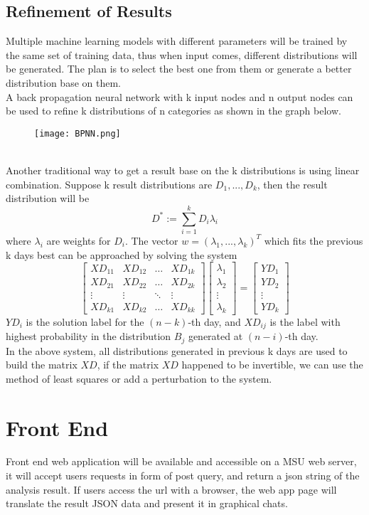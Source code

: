 \documentclass[11pt]{report}
\begin{document}
\subsection{Refinement of Results}
Multiple machine learning models with different parameters will be trained by the same set of training data, thus when input comes, different distributions will be generated. The plan is to select the best one from them or generate a better distribution base on them.\\
A back propagation neural network with k input nodes and n output nodes can be used to refine k distributions of n categories as shown in the graph below.\\
\begin{figure}[h]
\texttt{[image: BPNN.png]}
\end{figure}
\\
Another traditional way to get a result base on the k distributions is using linear combination. Suppose k result distributions are $D_1,...,D_k$, then the result distribution will be $$D^* := \sum_{i=1}^{k}{D_i\lambda_i}$$
where $\lambda_i$ are weights for $D_i$.
The vector $w = (\lambda_1,...,\lambda_k)^T$ which fits the previous k days best can be approached by solving the system
 \[
\begin{bmatrix}
    {XD}_{11} & {XD}_{12} & \dots  & {XD}_{1k} \\
    {XD}_{21} & {XD}_{22} & \dots  & {XD}_{2k} \\
    \vdots & \vdots & \ddots & \vdots \\
    {XD}_{k1} & {XD}_{k2} & \dots  & {XD}_{kk}
\end{bmatrix}
\begin{bmatrix}
	\lambda_1\\
	\lambda_2\\
	\vdots\\
	\lambda_k
\end{bmatrix}
=
\begin{bmatrix}
	{YD}_1\\
	{YD}_2\\
	\vdots\\
	{YD}_k
\end{bmatrix}
\]
$YD_i$ is the solution label for the $(n-k)$-th day, and $XD_{ij}$ is the label with highest probability in the distribution $B_j$ generated at $(n-i)$-th day.\\
In the above system, all distributions generated in previous k days are used to build the matrix ${XD}$, if the matrix ${XD}$ happened to be invertible, we can use the method of least squares or add a perturbation to the system.
\section{Front End}
Front end web application will be available and accessible on a MSU web server, it will accept users requests in form of post query, and return a json string of the analysis result. If users access the url with a browser, the web app page will translate the result JSON data and present it in graphical chats. 
\end{document}
